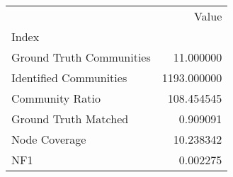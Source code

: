 \begin{tabular}{lr}
\toprule
{} &        Value \\
Index                    &              \\
\midrule
Ground Truth Communities &    11.000000 \\
Identified Communities   &  1193.000000 \\
Community Ratio          &   108.454545 \\
Ground Truth Matched     &     0.909091 \\
Node Coverage            &    10.238342 \\
NF1                      &     0.002275 \\
\bottomrule
\end{tabular}
